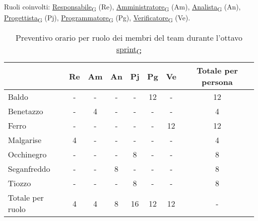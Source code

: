 \newpage
{}
Ruoli coinvolti: \href{https://7last.github.io/docs/rtb/documentazione-interna/glossario\#responsabile}{Responsabile\textsubscript{G}} (Re), \href{https://7last.github.io/docs/rtb/documentazione-interna/glossario\#amministratore}{Amministratore\textsubscript{G}} (Am), \href{https://7last.github.io/docs/rtb/documentazione-interna/glossario\#analista}{Analista\textsubscript{G}} (An), \href{https://7last.github.io/docs/rtb/documentazione-interna/glossario\#progettista}{Progettista\textsubscript{G}} (Pj), \href{https://7last.github.io/docs/rtb/documentazione-interna/glossario\#programmatore}{Programmatore\textsubscript{G}} (Pg), \href{https://7last.github.io/docs/rtb/documentazione-interna/glossario\#verificatore}{Verificatore\textsubscript{G}} (Ve).
\begin{table}[!h]
	\centering
	\begin{tabular}{ | l | c | c | c | c | c | c | c | }
		\hline
		\textbf{} & \textbf{Re} & \textbf{Am} &\textbf{An} & \textbf{Pj} & \textbf{Pg} & \textbf{Ve} & \textbf{Totale per persona} \\
		\hline			    %
		Baldo            &  -   &  -   &  -   &  -   & 12   &  -   & 12   \\
		Benetazzo        &  -   &  4   &  -   &  -   &  -   &  -   &  4   \\
		Ferro            &  -   &  -   &  -   &  -   &  -   & 12   & 12   \\
		Malgarise        &  4   &  -   &  -   &  -   &  -   &  -   &  4   \\
		Occhinegro       &  -   &  -   &  -   &  8   &  -   &  -   &  8   \\
		Seganfreddo      &  -   &  -   &  8   &  -   &  -   &  -   &  8   \\
		Tiozzo           &  -   &  -   &  -   &  8   &  -   &  -   &  8   \\
		\hline
		Totale per ruolo &  4   &  4   &  8   & 16   & 12   & 12   &  -   \\
		\hline
	\end{tabular}
	\caption{Preventivo orario per ruolo dei membri del team durante l'ottavo \href{https://7last.github.io/docs/rtb/documentazione-interna/glossario\#sprint}{sprint\textsubscript{G}}}

\end{table}

